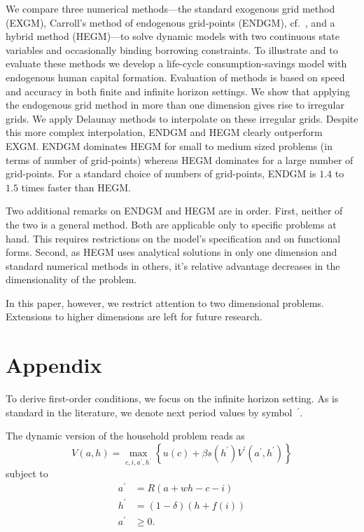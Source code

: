 \documentclass[a4paper,12pt]{article}
\begin{document}
We compare three numerical methods---the standard exogenous grid method (EXGM), Carroll's method of endogenous grid-points (ENDGM), cf.~, and a hybrid method (HEGM)---to solve dynamic models with two continuous state variables and occasionally binding borrowing constraints. To illustrate and to evaluate these methods we develop a life-cycle consumption-savings model with endogenous human capital formation. Evaluation of methods is based on speed and accuracy in both finite and infinite horizon settings. We show that applying the endogenous grid method in more than one dimension gives rise to irregular grids. We apply Delaunay methods to interpolate on these irregular grids. Despite this more complex interpolation, ENDGM and HEGM  clearly outperform EXGM. ENDGM dominates HEGM for small to medium sized problems (in terms of number of grid-points) whereas HEGM dominates for a large number of grid-points. For a standard choice of numbers of grid-points, ENDGM is $1.4$ to~$1.5$ times faster than HEGM.

Two additional remarks on ENDGM and HEGM are in order. First, neither of the two is a general method. Both are applicable only to specific problems at hand. This requires restrictions on the model's specification and on functional forms. Second, as HEGM uses analytical solutions in only one dimension and standard numerical methods in others, it's relative advantage decreases in the dimensionality of the problem.

In this paper, however, we restrict attention to two dimensional problems. Extensions to higher dimensions are left for future research.

\clearpage
\newpage

\section{Appendix}

\label{app:equations}

To derive first-order conditions, we focus on the infinite horizon setting. As is standard in the literature, we denote next period values by symbol~$^{\prime}$.

The dynamic version of the household problem reads as
\[
	V(a,h) = \underset{c,i,a^{\prime},h^{\prime}}{\max}\left\{u(c) + \beta s\left(h^{\prime}\right) V^{\prime}(a^{\prime},h^{\prime})\right\}
\]
subject to
\begin{align*}
	a^{\prime}  &  = R\left(a + wh - c - i\right)  \\
	h^{\prime}  &  = \left(1 - \delta\right) \left(h + f\left(i\right)\right)  \\
	a^{\prime}  &  \geq0.
\end{align*}
\end{document}
